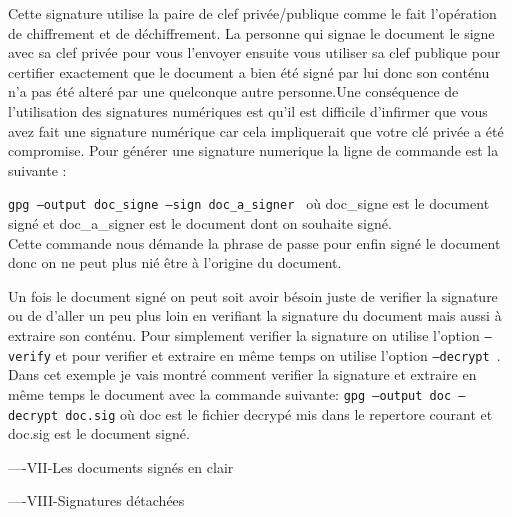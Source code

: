 Cette signature utilise la paire de clef privée/publique comme le fait l'opération de chiffrement et de déchiffrement.
La personne qui signae le document le signe avec sa clef privée pour vous l'envoyer ensuite vous utiliser sa clef publique
pour certifier exactement que le document a bien été signé par lui donc son conténu n'a pas été alteré par une quelconque 
autre personne.Une conséquence de l'utilisation des signatures numériques est qu'il est difficile d'infirmer que vous avez fait
une signature numérique car cela impliquerait que votre clé privée a été compromise.
Pour générer une signature numerique la ligne de commande est la suivante :

 \texttt{gpg --output doc\_signe --sign doc\_a\_signer } où doc\_signe est le document signé et doc\_a\_signer est le document 
 dont on souhaite signé.\\
 
 Cette commande nous démande la phrase de passe pour enfin signé le document donc on ne peut plus nié être à l'origine du 
 document.
 
 Un fois le document signé on peut soit avoir  bésoin juste de verifier la signature  ou de d'aller un peu plus loin en verifiant
 la signature du document mais aussi à extraire son conténu.
 Pour simplement verifier la signature on utilise l'option \texttt{--verify} et pour verifier et extraire en même temps on utilise l'option
  \texttt{--decrypt }.
 Dans cet exemple je vais montré comment verifier la signature et extraire en même temps le document avec la commande suivante:
  \texttt{gpg --output doc --decrypt doc.sig}  où doc est le fichier decrypé mis dans le repertore courant et doc.sig est le document signé.
 
 ----VII-Les documents signés en clair
 
 ----VIII-Signatures détachées  
 







